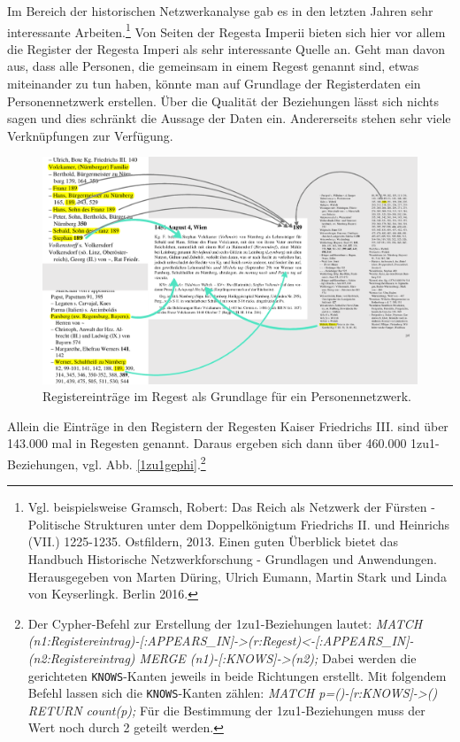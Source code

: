 \documentclass[ngerman,]{scrreprt}
\begin{document}
Im Bereich der historischen Netzwerkanalyse gab es in den letzten Jahren sehr interessante Arbeiten.\footnote{Vgl. beispielsweise Gramsch, Robert: Das Reich als Netzwerk der Fürsten - Politische Strukturen unter dem Doppelkönigtum Friedrichs II. und Heinrichs (VII.) 1225-1235. Ostfildern, 2013. Einen guten Überblick bietet das Handbuch Historische Netzwerkforschung - Grundlagen und Anwendungen. Herausgegeben von Marten Düring, Ulrich Eumann, Martin Stark und Linda von Keyserlingk. Berlin 2016.} Von Seiten der Regesta Imperii bieten sich hier vor allem die Register der Regesta Imperi als sehr interessante Quelle an. Geht man davon aus, dass alle Personen, die gemeinsam in einem Regest genannt sind, etwas miteinander zu tun haben, könnte man auf Grundlage der Registerdaten ein Personennetzwerk erstellen. Über die Qualität der Beziehungen lässt sich nichts sagen und dies schränkt die Aussage der Daten ein. Andererseits stehen sehr viele Verknüpfungen zur Verfügung.

\begin{figure}
\centering
\includegraphics{Bilder/Register-und-Regest-19-189.png}
\caption{Registereinträge im Regest als Grundlage für ein Personennetzwerk.}
\label{registereintraege}
\end{figure}

Allein die Einträge in den Registern der Regesten Kaiser Friedrichs III. sind über 143.000 mal in Regesten genannt. Daraus ergeben sich dann über 460.000 1zu1-Beziehungen, vgl. Abb. \ref{1zu1gephi}.\footnote{Der Cypher-Befehl zur Erstellung der 1zu1-Beziehungen lautet: \emph{MATCH (n1:Registereintrag)-{[}:APPEARS\_IN{]}-\textgreater{}(r:Regest)\textless{}-{[}:APPEARS\_IN{]}-(n2:Registereintrag) MERGE (n1)-{[}:KNOWS{]}-\textgreater{}(n2);} Dabei werden die gerichteten \texttt{KNOWS}-Kanten jeweils in beide Richtungen erstellt. Mit folgendem Befehl lassen sich die \texttt{KNOWS}-Kanten zählen: \emph{MATCH p=()-{[}r:KNOWS{]}-\textgreater{}() RETURN count(p);} Für die Bestimmung der 1zu1-Beziehungen muss der Wert noch durch 2 geteilt werden.}
\end{document}
